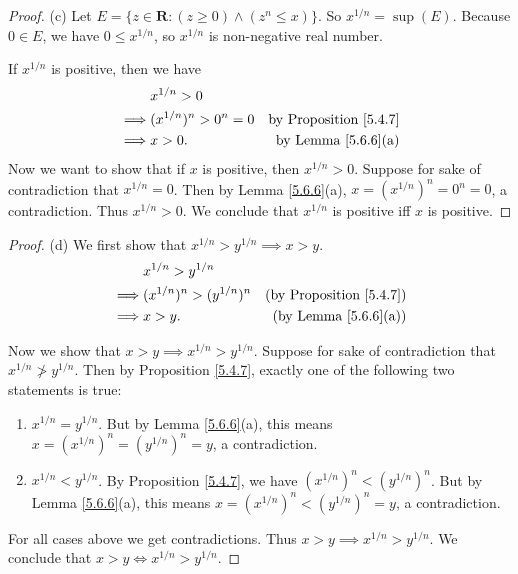 \begin{proof}{(c)}
    Let \(E = \{z \in \mathbf{R} : (z \geq 0) \land (z^n \leq x)\}\).
    So \(x^{1 / n} = \sup(E)\).
    Because \(0 \in E\), we have \(0 \leq x^{1 / n}\), so \(x^{1 / n}\) is non-negative real number.

    If \(x^{1 / n}\) is positive, then we have
    \begin{align*}
                 & x^{1 / n} > 0                                               \\
        \implies & (x^{1 / n})^n > 0^n = 0 & \text{by Proposition \ref{5.4.7}} \\
        \implies & x > 0.                  & \text{by Lemma \ref{5.6.6}(a)}    \\
    \end{align*}
    Now we want to show that if \(x\) is positive, then \(x^{1 / n} > 0\).
    Suppose for sake of contradiction that \(x^{1 / n} = 0\).
    Then by Lemma \ref{5.6.6}(a), \(x = (x^{1 / n})^n = 0^n = 0\), a contradiction.
    Thus \(x^{1 / n} > 0\).
    We conclude that \(x^{1 / n}\) is positive iff \(x\) is positive.
\end{proof}

\begin{proof}{(d)}
    We first show that \(x^{1 / n} > y^{1 / n} \implies x > y\).
    \begin{align*}
                 & x^{1 / n} > y^{1 / n}                                               \\
        \implies & (x^{1 / n})^n > (y^{1 / n})^n & \text{(by Proposition \ref{5.4.7})} \\
        \implies & x > y.                        & \text{(by Lemma \ref{5.6.6}(a))}
    \end{align*}

    Now we show that \(x > y \implies x^{1 / n} > y^{1 / n}\).
    Suppose for sake of contradiction that \(x^{1 / n} \not> y^{1 / n}\).
    Then by Proposition \ref{5.4.7}, exactly one of the following two statements is true:
    \begin{enumerate}[label=(\Roman*)]
        \item \(x^{1 / n} = y^{1 / n}\).
              But by Lemma \ref{5.6.6}(a), this means \(x = (x^{1 / n})^n = (y^{1 / n})^n = y\), a contradiction.
        \item \(x^{1 / n} < y^{1 / n}\).
              By Proposition \ref{5.4.7}, we have \((x^{1 / n})^n < (y^{1 / n})^n \).
              But by Lemma \ref{5.6.6}(a), this means \(x = (x^{1 / n})^n < (y^{1 / n})^n = y\), a contradiction.
    \end{enumerate}
    For all cases above we get contradictions.
    Thus \(x > y \implies x^{1 / n} > y^{1 / n}\).
    We conclude that \(x > y \iff x^{1 / n} > y^{1 / n}\).
\end{proof}

